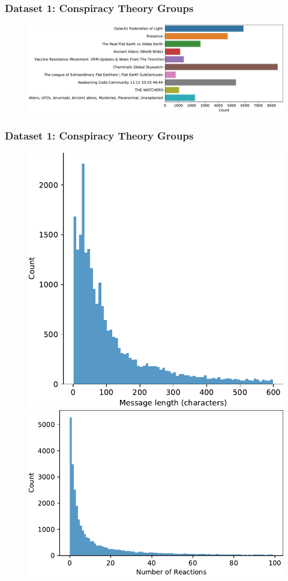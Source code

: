 \documentclass[notes]{tum-presentation}
\begin{document}
\begin{frame}
  \frametitle{Dataset 1: Conspiracy Theory Groups}
  \begin{figure}
      \centering
      \includegraphics[width=\textwidth]{../report/figures/dataset_groups/group_dist.pdf}
  \end{figure}
\end{frame}
\begin{frame}
  \frametitle{Dataset 1: Conspiracy Theory Groups}

  \begin{figure}
      \centering
      \includegraphics[width=.32\textwidth]{../report/figures/dataset_groups/message_length_dist.pdf}
      \includegraphics[width=.32\textwidth]{../report/figures/dataset_groups/reactions_dist.pdf}
  \end{figure} 
  
\end{frame}
\end{document}
